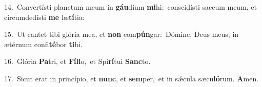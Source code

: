 {\numbfont\textcolor{\numbcolor}{14.}}~Convertísti planctum meum in \textbf{gáu}\-dium \textbf{mi}\-hi:~\star conscidísti saccum meum, et circumdedísti \textbf{me} læ\-\textbf{tí}\-tia:\par
{\numbfont\textcolor{\numbcolor}{15.}}~Ut cantet tibi glória mea, et \textbf{non} com\-\textbf{pún}\-gar:~\star Dómine, Deus meus, in ætérnum confi\-\textbf{té}\-bor \textbf{ti}\-bi.\par
{\numbfont\textcolor{\numbcolor}{16.}}~Glória \textbf{Pa}\-tri, et \textbf{Fí}\-\textbf{li}o,~\star et Spi\-\textbf{rí}\-tui \textbf{Sanc}\-to.\par
{\numbfont\textcolor{\numbcolor}{17.}}~Sicut erat in princípio, et \textbf{nunc}\-, et \textbf{sem}\-per,~\star et in sǽcula sæcu\-\textbf{ló}\-rum. \textbf{A}\-men.\par
